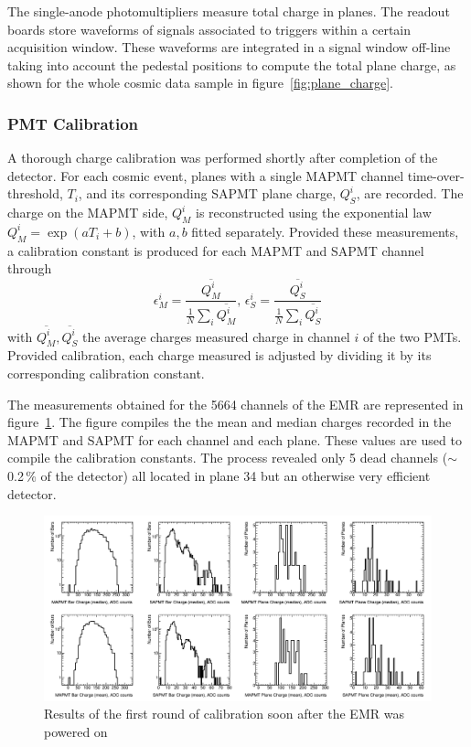 \documentclass[a4paper,11pt]{article}
\begin{document}
The single-anode photomultipliers measure total charge in planes. The readout boards store waveforms of signals associated to triggers within a certain acquisition window. These waveforms are integrated in a signal window off-line taking into account the pedestal positions to compute the total plane charge, as shown for the whole cosmic data sample in figure~\ref{fig:plane_charge}.

\subsubsection{PMT Calibration}\label{sec:calib}
A thorough charge calibration was performed shortly after completion of the detector. For each cosmic event, planes with a single MAPMT channel time-over-threshold, $T_i$, and its corresponding SAPMT plane charge, $Q_S^i$, are recorded. The charge on the MAPMT side, $Q_M^i$ is reconstructed using the exponential law $Q_M^i=\exp(aT_i+b)$, with $a,b$ fitted separately. Provided these measurements, a calibration constant is produced for each MAPMT and SAPMT channel through
\begin{equation}
\epsilon_M^i=\frac{\overline{Q_M^i}}{\frac{1}{N}\sum_{i}\overline{Q_M^i}},\,\epsilon_S^i=\frac{\overline{Q_S^i}}{\frac{1}{N}\sum_{i}\overline{Q_S^i}}
\end{equation}
with $\overline{Q_M^i}, \overline{Q_S^i}$ the average charges measured charge in channel $i$ of the two PMTs. Provided calibration, each charge measured is adjusted by dividing it by its corresponding calibration constant.

The measurements obtained for the 5664 channels of the EMR are represented in figure~\ref{fig:calib}. The figure compiles the the mean and median charges recorded in the MAPMT and SAPMT for each channel and each plane. These values are used to compile the calibration constants. The process revealed only 5 dead channels ($\sim$0.2\,\% of the detector) all located in plane 34 but an otherwise very efficient detector.

\begin{figure}
\centering
\includegraphics[width=\textwidth]{calibration_charge_distrib.png}
\caption{Results of the first round of calibration soon after the EMR was powered on}
\label{fig:calib}
\end{figure}
\end{document}
